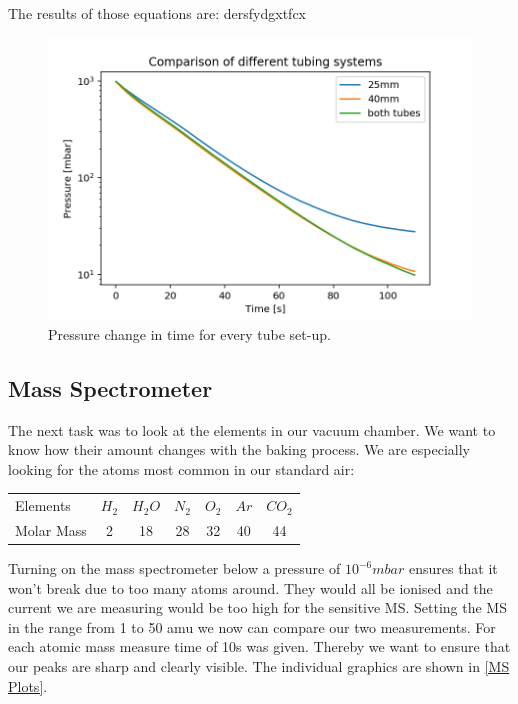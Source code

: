 \documentclass[]{article}
\begin{document}
The results of those equations are: dersfydgxtfcx

\begin{figure}[h]
\centering\includegraphics[width=.75\textwidth]{Plots/Comparison.png}
\caption{Pressure change in time for every tube set-up.}
\label{fig::comparison}
\end{figure}

\subsection{Mass Spectrometer}
The next task was to look at the elements in our vacuum chamber. We want to know how their amount changes with the baking process. We are especially looking for the atoms most common in our standard air:

\begin{table}[h]
\centering
\begin{tabular}{lcccccc}
Elements & $H_2$ & $H_2O$ & $N_2$ & $O_2$ & $Ar$ & $CO_2$ \\
Molar Mass & 2 & 18 & 28 & 32 & 40 & 44 \\
\end{tabular} 
\end{table}

Turning on the mass spectrometer below a pressure of $10^{-6} mbar$ ensures that it won't break due to too many atoms around. They would all be ionised and the current we are measuring would be too high for the sensitive MS. Setting the MS in the range from 1 to 50 amu we now can compare our two measurements. For each atomic mass measure time of 10s was given. Thereby we want to ensure that our peaks are sharp and clearly visible. The individual graphics are shown in \ref{MS Plots}.
\end{document}

